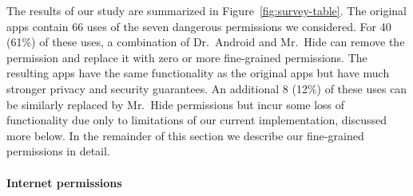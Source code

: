 \documentclass[preprint]{sig-alternate-10pt}
\newcommand{\lib}{Mr.\ Hide\xspace}
\newcommand{\rewriter}{Dr.\ Android\xspace}
\newcommand{\comment}[3][\color{red}]{}%
\newcommand{\tdm}[1]{\comment[\color{red}]{TDM}{#1}}
\newcommand{\kris}[1]{\comment[\color{orange}]{KM}{#1}}
\begin{document}
The results of our study are summarized in
Figure~\ref{fig:survey-table}.  %
%
%
The original apps contain 66 uses of the seven dangerous
permissions we considered.  
For 40 (61\%) of these uses, 
a combination of \rewriter and \lib can remove the
permission and replace it with zero or more fine-grained
permissions.
The resulting apps have the same functionality as the original apps but
have much stronger privacy and security guarantees.  An additional 8
(12\%) of these uses can be similarly replaced by \lib permissions
but incur
some loss of functionality due only to limitations of our current
implementation, discussed more below.
In the remainder of this section we describe our fine-grained
permissions in detail.

%

\paragraph*{Internet permissions}  
\end{document}
